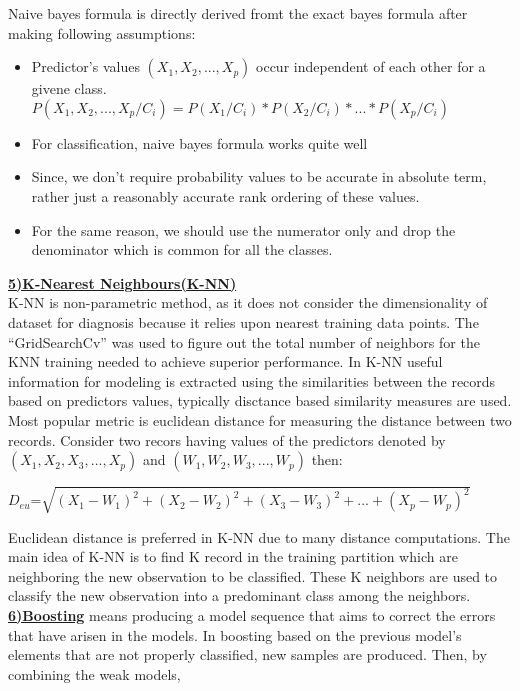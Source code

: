 \documentclass[11pt]{article}
\begin{document}
Naive bayes formula is directly derived fromt the exact bayes formula after making following assumptions:
\vspace{-0.5cm}
\begin{itemize}
\item Predictor's values $(X_{1},X_{2},...,X_{p})$ occur independent of each other for a givene class.\\
$P(X_{1},X_{2},...,X_{p}/C_{i})=P(X_{1}/C_{i})*P(X_{2}/C_{i})*...*P(X_{p}/C_{i})$
\item For classification, naive bayes formula works quite well
\item Since, we don't require probability values to be accurate in absolute term, rather just a reasonably accurate rank ordering of these values.
\item For the same reason, we should use the numerator only and drop the denominator which is common for all the classes.
\end{itemize}
\underline{\textbf{5)K-Nearest Neighbours(K-NN)}}\\ K-NN is non-parametric method, as it does not consider the dimensionality of dataset for diagnosis because it relies upon nearest training data points. The “GridSearchCv” was used to figure out the total number of neighbors for the KNN training needed to achieve superior performance. In K-NN useful information for modeling is extracted using the similarities between the records based on predictors values, typically disctance based similarity measures are used. Most popular metric is euclidean distance for measuring the distance between two records. Consider two recors having values of the predictors denoted by $(X_{1},X_{2},X_{3},...,X_{p})$ and $(W_{1},W_{2},W_{3},...,W_{p})$ then:
\begin{center}
$D_{eu}$=$\sqrt{(X_{1}-W_{1})^{2}+(X_{2}-W_{2})^{2}+(X_{3}-W_{3})^{2}+...+(X_{p}-W_{p})^{2}}$
\end{center}
Euclidean distance is preferred in K-NN due to many distance computations. The main idea of K-NN is to find K record in the training partition which are neighboring the new observation to be classified. These K neighbors are used to classify the new observation into a predominant class among the neighbors.\\
\underline{\textbf{6)Boosting}} means producing a model sequence that
aims to correct the errors that have arisen in the
models. In boosting based on the previous model’s elements that are not properly classified, new samples
are produced. Then, by combining the weak models,
\end{document}

